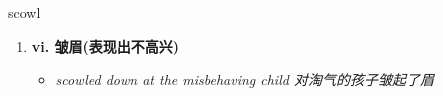 
\begin{frame}
{\huge scowl}
\begin{center}
\begin{enumerate}\Large
  \item \textbf{vi. 皱眉(表现出不高兴)}
  \begin{itemize}
    \item \em{\Large{scowled down at the misbehaving child 对淘气的孩子皱起了眉}}
  \end{itemize}
\end{enumerate}
\end{center}
\end{frame}
